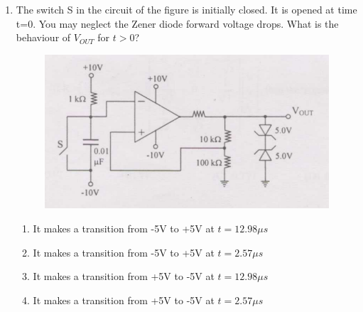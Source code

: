 \documentclass[journal]{IEEEtran}
\begin{document}
\begin{enumerate}
\begin{enumerate}
\end{enumerate}
\bigskip
\item The switch S in the circuit of the figure is initially closed. It is opened at time t=0. You may neglect the Zener diode forward voltage drops. What is the behaviour of $V_{OUT}$ for $t>0$? 
\begin{figure}[H]
   \centering
   \includegraphics[width=0.7\linewidth]{figs/fig_4.png}
   \label{stemplot}
\end{figure}
\begin{enumerate}
    \item It makes a transition from -5V to +5V at $t=12.98\mu s$
    \item It makes a transition from -5V to +5V at $t=2.57\mu s$
    \item It makes a transition from +5V to -5V at $t=12.98\mu s$
    \item It makes a transition from +5V to -5V at $t=2.57\mu s$


\end{enumerate}
\end{enumerate}
\end{document}
